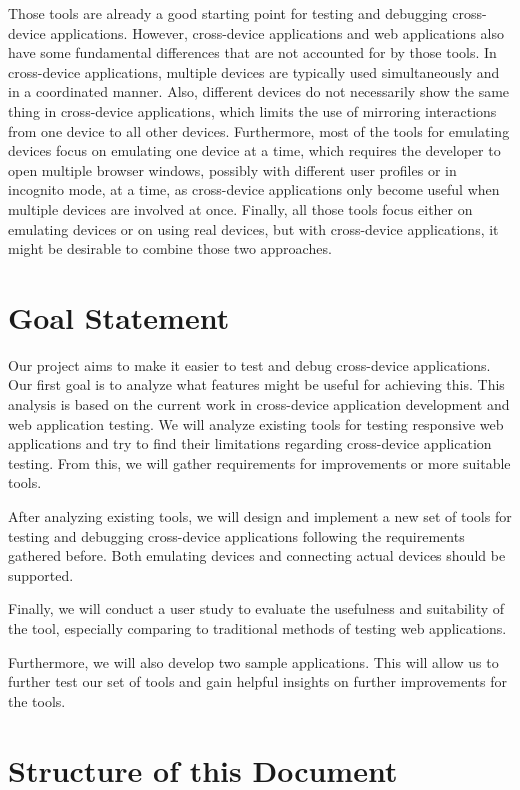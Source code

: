 Those tools are already a good starting point for testing and debugging cross-device applications. However, cross-device applications and web applications also have some fundamental differences that are not accounted for by those tools. In cross-device applications, multiple devices are typically used simultaneously and in a coordinated manner. Also, different devices do not necessarily show the same thing in cross-device applications, which limits the use of mirroring interactions from one device to all other devices. Furthermore, most of the tools for emulating devices focus on emulating one device at a time, which requires the developer to open multiple browser windows, possibly with different user profiles or in incognito mode, at a time, as cross-device applications only become useful when multiple devices are involved at once. Finally, all those tools focus either on emulating devices or on using real devices, but with cross-device applications, it might be desirable to combine those two approaches.

\section{Goal Statement}

Our project aims to make it easier to test and debug cross-device applications. Our first goal is to analyze what features might be useful for achieving this. This analysis is based on the current work in cross-device application development and web application testing. We will analyze existing tools for testing responsive web applications and try to find their limitations regarding cross-device application testing. From this, we will gather requirements for improvements or more suitable tools.

After analyzing existing tools, we will design and implement a new set of tools for testing and debugging cross-device applications following the requirements gathered before. Both emulating devices and connecting actual devices should be supported.

Finally, we will conduct a user study to evaluate the usefulness and suitability of the tool, especially comparing to traditional methods of testing web applications. 

Furthermore, we will also develop two sample applications. This will allow us to further test our set of tools and gain helpful insights on further improvements for the tools. 

\section{Structure of this Document}


